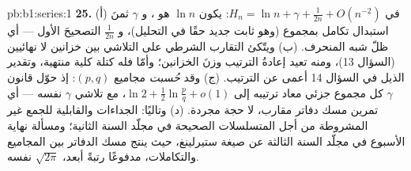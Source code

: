 \begin{solution}{pb:b1:series:1}
\textbf{25.} (أ) في $H_n = \ln n + \gamma + \frac{1}{2n} +
O(n^{-2})$: يكون $\ln n$ هو ، و $\gamma$ ثمنَ
استبدال تكامل بمجموع (وهو ثابت جديد حقًا في
التحليل)، و $\frac{1}{2n}$ التصحيحَ الأول --- أي
ظلّ شبه المنحرف. (ب) ويتّكئ التقارب الشرطي على
التلاشي بين خزانين لا نهائيين (السؤال 13)، ومنه
تعيد إعادةُ الترتيب وزنَ الخزانين؛ وأمّا  فله
كتلة كلية منتهية، وتقدير الذيل في السؤال 14
أعمى عن الترتيب. (ج) وقد \emph{حُسبت} مجاميع $(p,q)$: إذ
حوّل قانون $\gamma$ كل مجموع جزئي معاد ترتيبه إلى $\ln 2 +
\frac12\ln\frac pq + o(1)$، مع تلاشي $\gamma$ نفسه ---
أي تمرين مسك دفاتر مقارب، لا حجة مجردة.
(د) وتاليًا: الجداءات والقابلية للجمع غير المشروطة من أجل المتسلسلات
الصحيحة في مجلّد السنة الثانية؛ ومسألة نهاية الأسبوع في مجلّد السنة الثالثة
عن صيغة ستيرلينغ، حيث ينتج مسك الدفاتر
بين المجاميع والتكاملات، مدفوعًا رتبةً أبعد، $\sqrt{2\pi}$
نفسه.
\end{solution}
